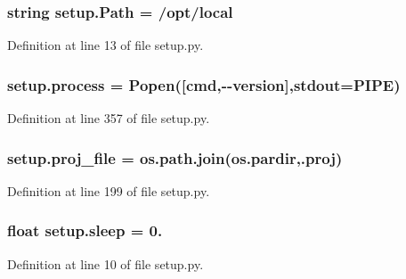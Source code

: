 \subsubsection[{\texorpdfstring{Path}{Path}}]{\setlength{\rightskip}{0pt plus 5cm}string setup.\+Path = \textquotesingle{}/opt/local\textquotesingle{}}\hypertarget{namespacesetup_a299d8d9205ed54eac073b608d9ab6af8}{}\label{namespacesetup_a299d8d9205ed54eac073b608d9ab6af8}


Definition at line 13 of file setup.\+py.

\subsubsection[{\texorpdfstring{process}{process}}]{\setlength{\rightskip}{0pt plus 5cm}setup.\+process = Popen(\mbox{[}{\bf cmd},\textquotesingle{}-\/-\/version\textquotesingle{}\mbox{]},stdout=P\+I\+PE)}\hypertarget{namespacesetup_a46c1652bf2b2336d1bf166fc69cbb168}{}\label{namespacesetup_a46c1652bf2b2336d1bf166fc69cbb168}


Definition at line 357 of file setup.\+py.

\subsubsection[{\texorpdfstring{proj\+\_\+file}{proj_file}}]{\setlength{\rightskip}{0pt plus 5cm}setup.\+proj\+\_\+file = os.\+path.\+join(os.\+pardir,\textquotesingle{}.proj\textquotesingle{})}\hypertarget{namespacesetup_aac6afb4198c065254f41a7ce8297da6a}{}\label{namespacesetup_aac6afb4198c065254f41a7ce8297da6a}


Definition at line 199 of file setup.\+py.

\subsubsection[{\texorpdfstring{sleep}{sleep}}]{\setlength{\rightskip}{0pt plus 5cm}float setup.\+sleep = 0.}\hypertarget{namespacesetup_aea013977d24d48e57270f412b2c222c2}{}\label{namespacesetup_aea013977d24d48e57270f412b2c222c2}


Definition at line 10 of file setup.\+py.


